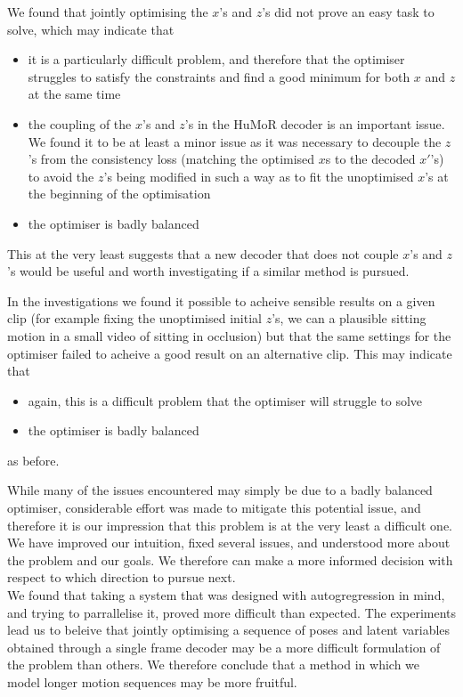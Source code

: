 We found that jointly optimising the $x$'s and $z$'s did not prove an easy task to solve, which may indicate that
\begin{itemize}
    \item it is a particularly difficult problem, and therefore that the optimiser struggles to satisfy the constraints and find a good minimum for both $x$ and $z$ at the same time
    \item the coupling of the $x$'s and $z$'s in the HuMoR decoder is an important issue. We found it to be at least a minor issue as it was necessary to decouple the $z$'s from the consistency loss (matching the optimised $x$s to the decoded $x'$'s) to avoid the $z$'s being modified in such a way as to fit the unoptimised $x$'s at the beginning of the optimisation
    \item the optimiser is badly balanced
\end{itemize}
This at the very least suggests that a new decoder that does not couple $x$'s and $z$'s would be useful and worth investigating if a similar method is pursued.

In the investigations we found it possible to acheive sensible results on a given clip (for example fixing the unoptimised initial $z$'s, we can a plausible sitting motion in a small video of sitting in occlusion) but that the same settings for the optimiser failed to acheive a good result on an alternative clip. This may indicate that 
\begin{itemize}
    \item again, this is a difficult problem that the optimiser will struggle to solve
    \item the optimiser is badly balanced
\end{itemize} as before.

While many of the issues encountered may simply be due to a badly balanced optimiser, considerable effort was made to mitigate this potential issue, and therefore it is our impression that this problem is at the very least a difficult one. We have improved our intuition, fixed several issues, and understood more about the problem and our goals. We therefore can make a more informed decision with respect to which direction to pursue next. \\
We found that taking a system that was designed with autogregression in mind, and trying to parrallelise it, proved more difficult than expected. The experiments lead us to beleive that jointly optimising a sequence of poses and latent variables obtained through a single frame decoder may be a more difficult formulation of the problem than others. We therefore conclude that a method in which we model longer motion sequences may be more fruitful.


